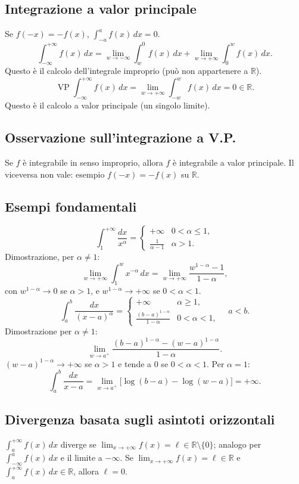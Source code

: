 \documentclass[11pt,a4paper]{article}
\newcommand{\R}{\mathbb R}\newcommand{\N}{\mathbb N}\newcommand{\pagina}[1]{\clearpage}
\begin{document}
\subsection*{Integrazione a valor principale}
Se $f(-x)=-f(x)$, $\int_{-a}^a f(x)\,dx=0$.
\[\int_{-\infty}^{+\infty}f(x)\,dx=\lim_{w\to-\infty}\int_w^0f(x)\,dx+\lim_{w\to+\infty}\int_0^w f(x)\,dx.\]
Questo è il calcolo dell'integrale improprio (può non appartenere a $\R$).
\[\operatorname{VP}\int_{-\infty}^{+\infty}f(x)\,dx=\lim_{w\to+\infty}\int_{-w}^w f(x)\,dx=0\in\R.\]
Questo è il calcolo a valor principale (un singolo limite).
\subsection*{Osservazione sull'integrazione a V.P.}
Se $f$ è integrabile in senso improprio, allora $f$ è integrabile a valor principale. Il viceversa non vale: esempio $f(-x)=-f(x)$ su $\R$.
\pagina{6}
\subsection*{Esempi fondamentali}
\[\int_1^{+\infty}\frac{dx}{x^\alpha}=\begin{cases}+\infty&0<\alpha\le1,\\\frac1{\alpha-1}&\alpha>1.\end{cases}\]
Dimostrazione, per $\alpha\ne1$:
\[\lim_{w\to+\infty}\int_1^w x^{-\alpha}\,dx=\lim_{w\to+\infty}\frac{w^{1-\alpha}-1}{1-\alpha},\]
con $w^{1-\alpha}\to0$ se $\alpha>1$, e $w^{1-\alpha}\to+\infty$ se $0<\alpha<1$.
\[\int_a^b\frac{dx}{(x-a)^\alpha}=\begin{cases}+\infty&\alpha\ge1,\\\frac{(b-a)^{1-\alpha}}{1-\alpha}&0<\alpha<1,\end{cases}\quad a<b.\]
Dimostrazione per $\alpha\ne1$:
\[\lim_{w\to a^+}\frac{(b-a)^{1-\alpha}-(w-a)^{1-\alpha}}{1-\alpha}.\]
$(w-a)^{1-\alpha}\to+\infty$ se $\alpha>1$ e tende a $0$ se $0<\alpha<1$.
Per $\alpha=1$:
\[\int_a^b\frac{dx}{x-a}=\lim_{w\to a^+}\bigl[\log(b-a)-\log(w-a)\bigr]=+\infty.\]
\subsection*{Divergenza basata sugli asintoti orizzontali}
$\int_a^{+\infty}f(x)\,dx$ diverge se $\lim_{x\to+\infty}f(x)=\ell\in\R\setminus\{0\}$; analogo per $\int_{-\infty}^a f(x)\,dx$ e il limite a $-\infty$. Se $\lim_{x\to+\infty}f(x)=\ell\in\R$ e $\int_a^{+\infty}f(x)\,dx\in\R$, allora $\ell=0$.
\pagina{7}
\end{document}
